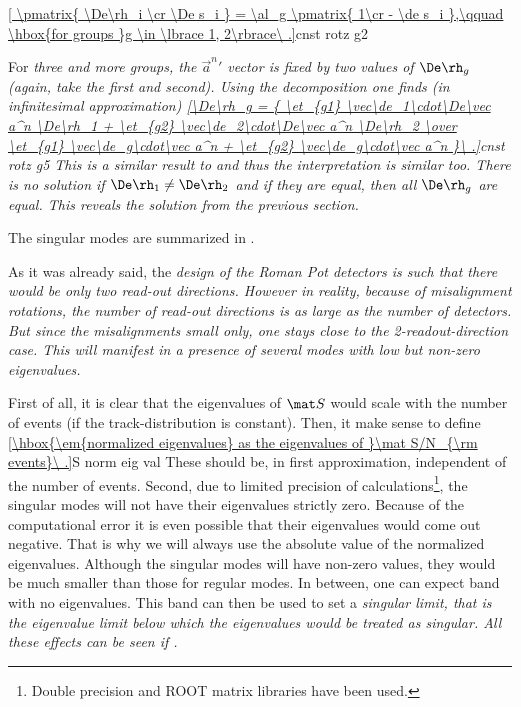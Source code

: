\eqref{
\pmatrix{
\De\rh_i \cr
\De s_i
} = \al_g \pmatrix{
1\cr
- \de s_i
},\qquad \hbox{for groups }g \in \lbrace 1, 2\rbrace\ .}{cnst rotz g2}


For \em{three and more groups}, the ${\vec a^n}'$ vector is fixed by two values of $\De\rh_g$ (again, take the first and second). Using the decomposition  one finds (in infinitesimal approximation)
\eqref{\De\rh_g = {
\et_{g1} \vec\de_1\cdot\De\vec a^n \De\rh_1 + \et_{g2} \vec\de_2\cdot\De\vec a^n \De\rh_2
\over
\et_{g1} \vec\de_g\cdot\vec a^n + \et_{g2} \vec\de_g\cdot\vec a^n
}\ .}{cnst rotz g5}
This is a similar result to  and thus the interpretation is similar too. There is no solution if $\De\rh_1 \neq \De\rh_2$ and if they are equal, then all $\De\rh_g$ are equal. This reveals the solution  from the previous section.

The singular modes are summarized in .

As it was already said, the \em{design} of the Roman Pot detectors is such that there would be only two read-out directions. However in \em{reality}, because of misalignment rotations, the number of read-out directions is as large as the number of detectors. But since the misalignments small only, one stays close to the 2-readout-direction case. This will manifest in a presence of several modes with low but non-zero eigenvalues. 

 First of all, it is clear that the eigenvalues of $\mat S$ would scale with the number of events (if the track-distribution is constant). Then, it make sense to define
\eqref{\hbox{\em{normalized eigenvalues} as the eigenvalues of }\mat S/N_{\rm events}\ .}{S norm eig val}
These should be, in first approximation, independent of the number of events. Second, due to limited precision of calculations\footnote{Double precision and ROOT matrix libraries have been used.}, the singular modes will not have their eigenvalues strictly zero. Because of the computational error it is even possible that their eigenvalues would come out negative. That is why we will always use the absolute value of the normalized eigenvalues. Although the singular modes will have non-zero values, they would be much smaller than those for regular modes. In between, one can expect band with no eigenvalues. This band can then be used to set a \em{singular limit}, that is the eigenvalue limit below which the eigenvalues would be treated as singular. All these effects can be seen if .

